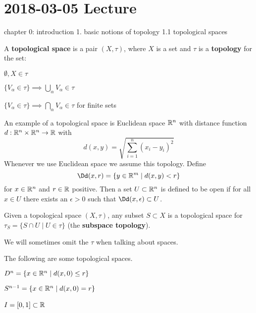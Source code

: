 \section{2018-03-05 Lecture}

chapter 0: introduction
1. basic notions of topology
1.1 topological spaces

\begin{defn}
	A \textbf{topological space} is a pair $(X,\tau)$, where $X$ is a set and $\tau$ is a \textbf{topology} for the set:
	\begin{itm}
		\item $\emptyset, X \in \tau$
		\item $\{V_\alpha \in \tau\} \implies \bigcup_\alpha V_\alpha \in \tau$
		\item $\{V_\alpha \in \tau\} \implies \bigcap_\alpha V_\alpha \in \tau$ for finite sets
	\end{itm}
\end{defn}

\begin{exam}
	An example of a topological space is Euclidean space $\mathbb{R}^n$ with distance function $d: \mathbb{R}^n \times \mathbb{R}^n \to \mathbb{R}$ with
	\[d(x,y) = \sqrt{\sum_{i=1}^n(x_i-y_i)^2}\]
	\[\]
	Whenever we use Euclidean space we assume this topology.
	Define
	\[\Dd(x,r) = \{y \in \RR^m \mid d(x,y)<r\}\]
	for $x \in \mathbb{R}^n$ and $r \in \mathbb{R}$ positive.
	Then a set $U \subset \mathbb{R}^n$ is defined to be open if for all $x \in U$ there exists an $\epsilon>0$ such that $\Dd(x,\epsilon) \subset U$.
\end{exam}

\begin{defn}
	Given a topological space $(X,\tau)$, any subset $S \subset X$ is a topological space for $\tau_S = \{S \cap U \mid U \in \tau\}$ (the \textbf{subspace topology}).
\end{defn}

We will sometimes omit the $\tau$ when talking about spaces.

\begin{exam}
	The following are some topological spaces.
	\begin{itm}
		\item $D^n = \{x \in \mathbb{R}^n \mid d(x,0) \leq r\}$
		\item $S^{n-1} = \{x \in \mathbb{R}^n \mid d(x,0) = r\}$
		\item $I = [0,1] \subset \mathbb{R}$\
	\end{itm}
\end{exam}

